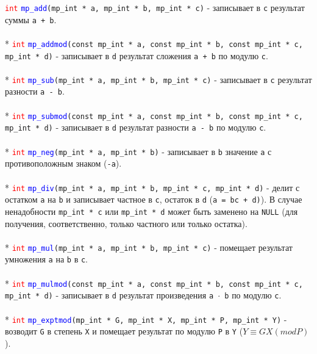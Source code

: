 \documentclass[12pt]{article}
\begin{document}
\textcolor{red}{\texttt{int}} \textcolor{blue}{\texttt{mp\_add}}\texttt{(mp\_int * a, mp\_int * b, mp\_int * c)} - записывает в \texttt{c} результат суммы \texttt{a + b}.\\
\\*
\textcolor{red}{\texttt{int}} \textcolor{blue}{\texttt{mp\_addmod}}\texttt{(const mp\_int * a, const mp\_int * b, const mp\_int * c, mp\_int * d)} - записывает в \texttt{d} результат сложения \texttt{a + b} по модулю \texttt{c}. \\
\\*
\textcolor{red}{\texttt{int}} \textcolor{blue}{\texttt{mp\_sub}}\texttt{(mp\_int * a, mp\_int * b, mp\_int * c)} - записывает в \texttt{с} результат разности \texttt{a - b}.\\
\\*
\textcolor{red}{\texttt{int}} \textcolor{blue}{\texttt{mp\_submod}}\texttt{(const mp\_int * a, const mp\_int * b, const mp\_int * c, mp\_int * d)} - записывает в \texttt{d} результат разности \texttt{a - b} по модулю \texttt{c}. \\
\\*
\textcolor{red}{\texttt{int}} \textcolor{blue}{\texttt{mp\_neg}}\texttt{(mp\_int * a, mp\_int * b)} - записывает в \texttt{b} значение \texttt{a} с противоположным знаком (\texttt{-a}).\\
\\*
\textcolor{red}{\texttt{int}} \textcolor{blue}{\texttt{mp\_div}}\texttt{(mp\_int * a, mp\_int * b, mp\_int * c, mp\_int * d)} - делит с остатком \texttt{a} на \texttt{b} и записывает частное в \texttt{c}, остаток в \texttt{d} (\texttt{a = bc + d)}). В случае ненадобности \texttt{mp\_int * c} или \texttt{mp\_int * d} может быть заменено на \texttt{NULL} (для получения, соответственно, только частного или только остатка). \\
\\*
\textcolor{red}{\texttt{int}} \textcolor{blue}{\texttt{mp\_mul}}\texttt{(mp\_int * a, mp\_int * b, mp\_int * c)} - помещает результат умножения \texttt{a} на \texttt{b} в \texttt{c}.\\
\\*
\textcolor{red}{\texttt{int}} \textcolor{blue}{\texttt{mp\_mulmod}}\texttt{(const mp\_int * a, const mp\_int * b, const mp\_int * c, mp\_int * d)} - записывает в \texttt{d} результат произведения \texttt{a $\cdot$ b} по модулю \texttt{c}. \\
\\*
\textcolor{red}{\texttt{int}} \textcolor{blue}{\texttt{mp\_exptmod}}\texttt{(mp\_int * G, mp\_int * X, mp\_int * P, mp\_int * Y)} - возводит \texttt{G} в степень \texttt{Х} и помещает результат по модулю \texttt{Р} в \texttt{Y} (\texttt{$Y \equiv G X (mod P)$}).\\
\end{document}
